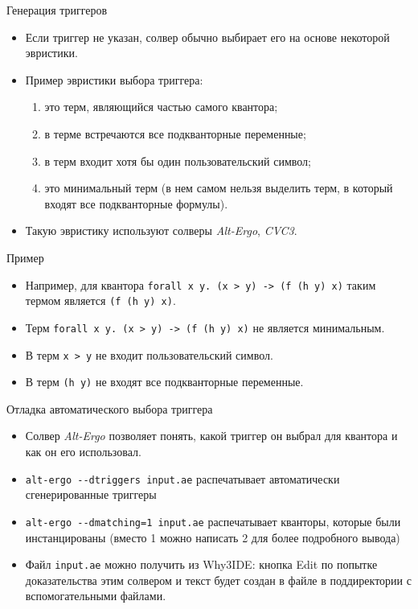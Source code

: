 \documentclass[hyperref={unicode=true}]{beamer}
\begin{document}
    \begin{frame}{Генерация триггеров}
    \begin{itemize}
    \item
    Если триггер не указан, солвер обычно выбирает его на основе
    некоторой эвристики.
    \item
    Пример эвристики выбора триггера:
        \begin{enumerate}
        \item это терм, являющийся частью самого квантора;
        \item в терме встречаются все подкванторные переменные;
        \item в терм входит хотя бы один пользовательский символ;
        \item это минимальный терм (в нем самом нельзя выделить
                терм, в который входят все подкванторные формулы).
        \end{enumerate}
    \item
    Такую эвристику используют солверы \textsl{Alt-Ergo}, \textsl{CVC3}.
    \end{itemize}
    \end{frame}

    \begin{frame}{Пример}
    \begin{itemize}
    \item Например, для квантора \texttt{forall x y. (x > y) -> (f (h y) x)}
    таким термом является \texttt{(f (h y) x)}.
    \item Терм \texttt{forall x y. (x > y) -> (f (h y) x)} не является
    минимальным.
    \item В терм \texttt{x > y} не входит пользовательский символ.
    \item В терм \texttt{(h y)} не входят все подкванторные переменные.
    \end{itemize}
    \end{frame}

    \begin{frame}{Отладка автоматического выбора триггера}
    \begin{itemize}
    \item
    Солвер \textsl{Alt-Ergo} позволяет понять, какой триггер он выбрал
    для квантора и как он его использовал.
    \item
    \texttt{alt-ergo -{}-dtriggers input.ae} распечатывает
    автоматически сгенерированные триггеры
    \item
    \texttt{alt-ergo -{}-dmatching=1 input.ae} распечатывает
    кванторы, которые были инстанцированы (вместо 1 можно написать 2 для
            более подробного вывода)
    \item
    Файл \texttt{input.ae} можно получить из Why3IDE: кнопка Edit
    по попытке доказательства этим солвером и текст будет создан в файле
    в поддиректории с вспомогательными файлами.
    \end{itemize}
    \end{frame}
\end{document}
